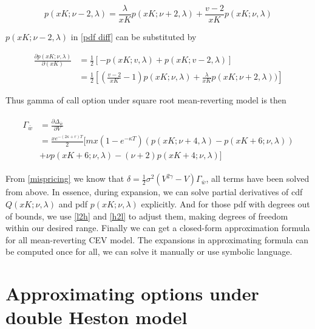 \begin{equation}\label{l2h}
    p(xK ; \nu-2, \lambda)=\frac{\lambda}{xK} p(xK ; \nu+2, \lambda)+\frac{v-2}{xK} p(xK ; \nu, \lambda)
\end{equation}

\noindent $p(xK;\nu-2,\lambda)$ in \eqref{pdf diff} can be substituted by

\begin{equation}\label{pdf2}
    \begin{aligned}
        \frac{\partial p(xK;\nu,\lambda)}{\partial (xK)}&=\frac{1}{2}[-p(xK ; v, \lambda)+p(xK ; v-2, \lambda)]\\
        &=\frac{1}{2}\left[(\frac{v-2}{xK}-1) p(xK ; \nu, \lambda) + \frac{\lambda}{xK} p(xK ; \nu+2, \lambda))\right]
    \end{aligned}
\end{equation}

Thus gamma of call option under square root mean-reverting model is then

\begin{equation}\label{gamma}
    \begin{aligned}
        \begin{aligned}
            \Gamma_{\bar{w}}&= \frac{\partial \Delta_{\bar{w}}}{\partial V} \\
            &= \frac{xe^{-(2\kappa +r )T}}{2} [mx(1-e^{-\kappa T})(p(xK ; \nu+4, \lambda)-p(xK+6 ; \nu, \lambda)) \\
            &+ \nu p(xK+6 ; \nu, \lambda) - (\nu+2)p(xK+4 ; \nu, \lambda)]
            \end{aligned}
    \end{aligned}
\end{equation}

From \eqref{mispricing} we know that $\delta = \frac{1}{2} \sigma^2 (V^{2\gamma}-V) \Gamma_{\bar{w}}$, all terms have been solved from above. In essence, during expansion, we can solve partial derivatives of cdf $Q(xK;\nu,\lambda)$ and pdf $p(xK;\nu,\lambda)$ explicitly. And for those pdf with degrees out of bounds, we use \eqref{l2h} and \eqref{h2l} to adjust them, making degrees of freedom within our desired range. Finally we can get a closed-form approximation formula for all mean-reverting CEV model. The expansions in approximating formula can be computed once for all, we can solve it manually or use symbolic language.

\section{Approximating options under double Heston model}

